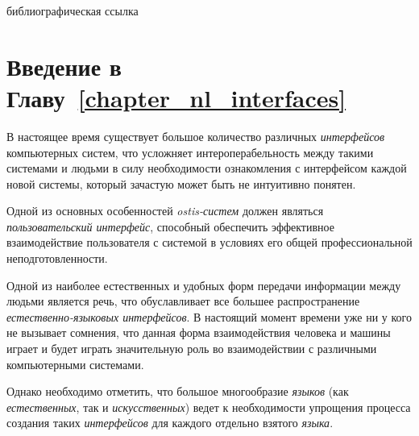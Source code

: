 \begin{SCn}
	\begin{scnrelfromlist}{библиографическая ссылка}
	\end{scnrelfromlist}
\end{SCn}

\bigskip

\section*{Введение в Главу~\ref{chapter_nl_interfaces}}

В настоящее время существует большое количество различных \textit{интерфейсов} компьютерных систем, что усложняет интероперабельность между такими системами и людьми в силу необходимости ознакомления с интерфейсом каждой новой системы, который зачастую может быть не интуитивно понятен.

Одной из основных особенностей \textit{ostis-систем} должен являться \textit{пользовательский интерфейс}, способный обеспечить эффективное взаимодействие пользователя с системой в условиях его общей профессиональной неподготовленности.

Одной из наиболее естественных и удобных форм передачи информации между людьми является речь, что обуславливает все большее распространение \textit{естественно-языковых интерфейсов}.
В настоящий момент времени уже ни у кого не вызывает сомнения, что данная форма взаимодействия человека и машины играет и будет играть значительную роль во взаимодействии с различными компьютерными системами.

Однако необходимо отметить, что большое многообразие \textit{языков} (как \textit{естественных}, так и \textit{искусственных}) ведет к необходимости упрощения процесса создания таких \textit{интерфейсов} для каждого отдельно взятого \textit{языка}.

